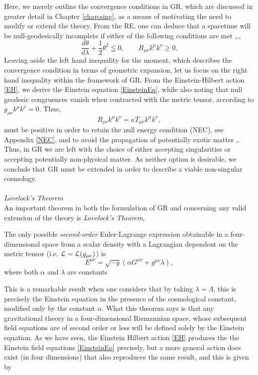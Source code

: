 Here, we merely outline the convergence conditions in GR, which are discussed in greater detail in Chapter \ref{chap:sing}, as a means of motivating the need to modify or extend the theory. From the RE, one can deduce that a spacetime will be null-geodesically incomplete if either of the following conditions are met \cite{Kar:2006ms},\cite{Borde:1996pt},\cite{Vachaspati:1998dy},
\[
\frac{d\theta}{d\lambda}+\frac{1}{2}\theta^2\leqq 0,\qquad R_{\mu\nu}k^\mu k^\nu\geq 0.
\]
Leaving aside the left hand inequality for the moment, which describes the convergence condition in terms of geometric expansion, let us focus on the right hand inequality within the framework of GR. From the Einstein-Hilbert action \eqref{EH}, we derive the Einstein equation \eqref{EinsteinEq}, while also noting that null geodesic congruences vanish when contracted with the metric tensor, according to $g_{\mu\nu}k^{\mu}k^{\nu}=0$. Thus,
\[
R_{\mu\nu}k^\mu k^\nu = \kappa T_{\mu\nu}k^\mu k^\nu 
,\]
must be positive in order to retain the null energy condition (NEC), see Appendix \eqref{NEC}, and to avoid the propagation of potentially exotic matter \cite{Capozziello:2013vna},\cite{Elder:2013gya}. Thus, in GR we are left with the choice of either accepting singularities or accepting potentially non-physical matter. As neither option is desirable, we conclude that GR must be extended in order to describe a viable non-singular cosmology.
\\\\\emph{Lovelock's Theorem}\\
An important theorem in both the formulation of GR and concerning any valid extension of the theory is \emph{Lovelock's Theorem}\cite{Clifton:2011jh},\cite{Lovelock1969}
\begin{theorem}
The only possible \emph{second-order} Euler-Lagrange expression obtainable in a four-dimensional space from a scalar density with a Lagrangian dependent on the metric tensor (i.e. ${\cal L}={\cal L}(g_{\mu\nu})$) is
\[
E^{\mu\nu}=\sqrt{-g}\left(\alpha G^{\mu\nu}+g^{\mu\nu}\lambda\right),
\]
where both $\alpha$ and $\lambda$ are constants 
\end{theorem}
 This is a remarkable result when one considers that by taking $\lambda=\Lambda$, this is precisely the Einstein equation in the presence of the cosmological constant, modified only by the constant $\alpha$. What this theorem says is that any gravitational theory in a four-dimensional Riemannian space, whose subsequent field equations are of second order or less will be defined solely by the Einstein equation. As we have seen, the Einstein Hilbert action \eqref{EH} produces the the Einstein field equations \eqref{EinsteinEq} precisely, but a more general action does exist (in four dimensions) that also reproduces the same result, and this is given by
